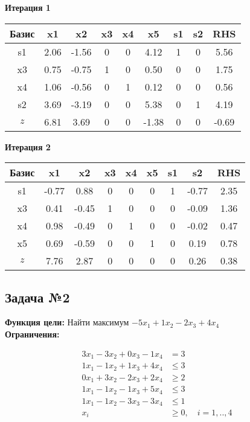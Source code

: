 \documentclass[a4paper,12pt]{article}
\begin{document}
 \textbf{Итерация 1}\\
\begin{tabular}{|c|c|c|c|c|c|c|c|c|}
\hline
Базис & x1 & x2 & x3 & x4 & x5 & s1 & s2 & RHS \\ \hline
s1 & 2.06 & -1.56 & 0 & 0 & 4.12 & 1 & 0 & 5.56 \\ \hline
x3 & 0.75 & -0.75 & 1 & 0 & 0.50 & 0 & 0 & 1.75 \\ \hline
x4 & 1.06 & -0.56 & 0 & 1 & 0.12 & 0 & 0 & 0.56 \\ \hline
s2 & 3.69 & -3.19 & 0 & 0 & 5.38 & 0 & 1 & 4.19 \\ \hline
$z$ & 6.81 & 3.69 & 0 & 0 & -1.38 & 0 & 0 & -0.69 \\ \hline
\end{tabular}
\vspace{5mm}

 \textbf{Итерация 2}\\
\begin{tabular}{|c|c|c|c|c|c|c|c|c|}
\hline
Базис & x1 & x2 & x3 & x4 & x5 & s1 & s2 & RHS \\ \hline
s1 & -0.77 & 0.88 & 0 & 0 & 0 & 1 & -0.77 & 2.35 \\ \hline
x3 & 0.41 & -0.45 & 1 & 0 & 0 & 0 & -0.09 & 1.36 \\ \hline
x4 & 0.98 & -0.49 & 0 & 1 & 0 & 0 & -0.02 & 0.47 \\ \hline
x5 & 0.69 & -0.59 & 0 & 0 & 1 & 0 & 0.19 & 0.78 \\ \hline
$z$ & 7.76 & 2.87 & 0 & 0 & 0 & 0 & 0.26 & 0.38 \\ \hline
\end{tabular}
\vspace{5mm}



\subsection*{Задача №2}
\textbf{Функция цели: }
Найти максимум $ -5x_{1} +1x_{2} -2x_{3} +4x_{4} $\\

\textbf{Ограничения:}

\[ \begin{aligned}
3x_{1} -3x_{2} +0x_{3} -1x_{4} &= 3 \\
1x_{1} -1x_{2} +1x_{3} +4x_{4} &\le 3 \\
0x_{1} +3x_{2} -2x_{3} +2x_{4} &\ge 2 \\
1x_{1} -1x_{2} -1x_{3} +5x_{4} &\le 3 \\
1x_{1} -1x_{2} -3x_{3} -3x_{4} &\le 1 \\
x_i &\ge 0,\quad i=1,..,4\\
\end{aligned}\]
\end{document}
